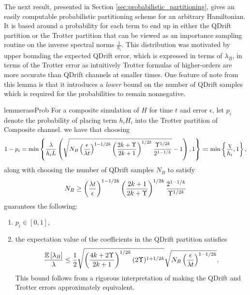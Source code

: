 The next result, presented in Section \ref{sec:probabilistic_partitioning}, gives an easily computable probabilistic partitioning scheme for an arbitrary Hamiltonian. It is based around a probability for each term to end up in either the QDrift partition or the Trotter partition that can be viewed as an importance sampling routine on the inverse spectral norms $\frac{1}{h_i}$. This distribution was motivated by upper bounding the expected QDrift error, which is expressed in terms of $\lambda_B$, in terms of the Trotter error as intuitively Trotter formulas of higher-orders are more accurate than QDrift channels at smaller times. One feature of note from this lemma is that it introduces a \emph{lower} bound on the number of QDrift samples which is required for the probabilities to remain nonnegative.
\begin{restatable}{lemmer}{assProb} \label{lem:prob_lemma}
For a composite simulation of $H$ for time $t$ and error $\epsilon$, let $p_i$ denote the probability of placing term $h_i H_i$ into the Trotter partition of Composite channel. we have that choosing 
\begin{equation}
    1-p_i = \min\left\{ \frac{\lambda}{h_i L} \left(  \sqrt{ N_B \left( \frac{\epsilon}{\lambda t} \right)^{1-1/2k} \left( \frac{2k+\Upsilon}{2k+1} \right)^{1/2k} \frac{\Upsilon^{1/2k}}{2^{1-1/k}} } - 1 \right),1 \right\} \eqqcolon \min \left\{ \frac{\chi}{h_i},1 \right\}, \label{eq:prob_def}
\end{equation}
along with choosing the number of QDrift samples $N_B$ to satisfy
\begin{equation}
    N_B \geq \left( \frac{\lambda t}{\epsilon} \right)^{1 - 1/2k} \left( \frac{2k + 1}{2k + \Upsilon} \right)^{1/2k} \frac{2^{1-1/k}}{\Upsilon^{1/2k}}
\end{equation}
guarantees the following:
\begin{enumerate}
    \item $p_i \in [0,1]$,
    \item the expectation value of the coefficients in the QDrift partition satisfies 
    $$\frac{ \mathbb{E}\left[ \lambda_B \right] }{\lambda} \leq \frac{1}{2} \sqrt{\left( \frac{4k + 2 \Upsilon}{2k + 1} \right)^{1/2k} (2 \Upsilon)^{1+1/2k}} \sqrt{N_B \left( \frac{\epsilon}{\lambda t} \right)^{1-1/2k}} .$$ This bound follows from a rigorous interpretation of making the QDrift and Trotter errors approximately equivalent.
\end{enumerate}
\end{restatable}

